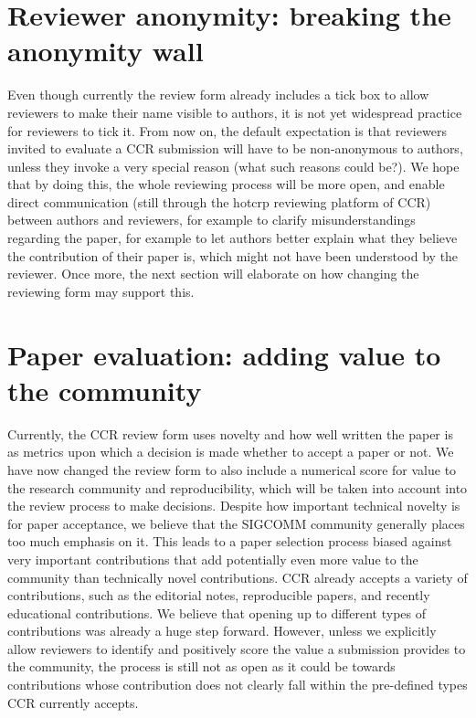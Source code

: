 \documentclass[letterpaper]{article}
\begin{document}
\begin{multicols}{2}
\section{Reviewer anonymity: breaking the anonymity wall}

Even though currently the review form already includes a tick box to allow reviewers to make their name visible to authors, it is not yet widespread practice for reviewers to tick it. From now on, the default expectation is that reviewers invited to evaluate a CCR submission will have to be non-anonymous to authors, unless they invoke a very special reason (what such reasons could be?). We hope that by doing this, the whole reviewing process will be more open, and enable direct communication (still through the hotcrp reviewing platform of CCR) between authors and reviewers, for example to clarify misunderstandings regarding the paper, for example to let authors better explain what they believe the contribution of their paper is, which might not have been understood by the reviewer. Once more, the next section will elaborate on how changing the reviewing form may support this.

\section{Paper evaluation: adding value to the community}

Currently, the CCR review form uses novelty and how well written the paper is as metrics upon which a decision is made whether to accept a paper or not. We have now changed the review form to also include a numerical score for value to the research community and reproducibility, which will be taken into account into the review process to make decisions. Despite how important technical novelty is for paper acceptance, we believe that the SIGCOMM community generally places too much emphasis on it. This leads to a paper selection process biased against very important contributions that add potentially even more value to the community than technically novel contributions. CCR already accepts a variety of contributions, such as the editorial notes, reproducible papers, and recently educational contributions. We believe that opening up to different types of contributions was already a huge step forward. However, unless we explicitly allow reviewers to identify and positively score the value a submission provides to the community, the process is still not as open as it could be towards contributions whose contribution does not clearly fall within the pre-defined types CCR currently accepts.



\end{multicols}
\end{document}
